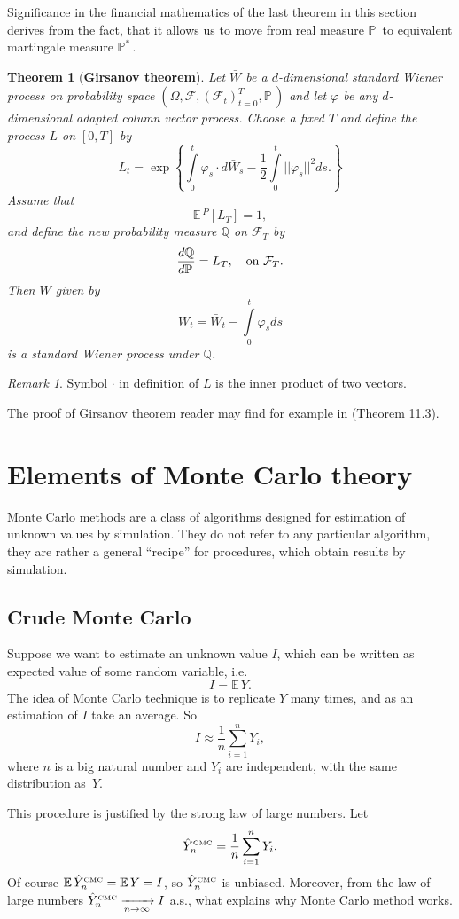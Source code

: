 \documentclass[a4paper,12pt, oneside]{book}
\newtheorem{thm}{Theorem}[section]
\theoremstyle{definition}
\theoremstyle{remark}
\newtheorem{remark}{Remark}
\def\E{{\mathbb{E}}\,}
\def\P{{\mathbb{P}}\,}
\def\Pm{{\mathbb{P}}^*\,}
\def\conv{\xrightarrow[n \rightarrow \infty]{}}
\def\CMC[#1]{\hat{Y}^{\hbox{\tiny CMC}}_{#1}}
\begin{document}
Significance in the financial mathematics of the last theorem in this section derives from the fact, that it allows us to move from real measure $\P$ to equivalent martingale measure $\Pm$.
\begin{thm}[\bfseries Girsanov theorem]
 \label{thm:girsanov}
 Let $\bar{W}$ be a $d$-dimensional standard Wiener process on probability space $(\Omega, \mathcal{F}, (\mathcal{F}_t)_{t=0}^T, \P)$ and let $\varphi$ be any $d$-dimensional adapted column vector process. Choose a fixed $T$ and define the process $L$ on $[0,T]$ by
 \[ L_t = \exp\left\{ \int\limits_0^t \varphi_s \cdot d\bar{W}_s - \frac{1}{2}\int\limits_0^t ||\varphi_s||^2ds. \right\} \]
 Assume that 
 \[ \E^P[L_T] = 1, \]
 and define the new probability measure $\mathbb{Q}$ on $\mathcal{F}_T$ by
 \[ \frac{d\mathbb{Q}}{d\P} = L_T,\ \ \hbox{ on } \mathcal{F}_T. \]
 Then $W$ given by
 \[W_t = \bar{W}_t - \int\limits_0^t \varphi_s ds\]
 is a standard Wiener process under $\mathbb{Q}$.
\end{thm}
\begin{remark}
 Symbol $\cdot$ in definition of $L$ is the inner product of two vectors. 
\end{remark}
The proof of Girsanov theorem reader may find for example in \cite{bjork} (Theorem 11.3).

\section{Elements of Monte Carlo theory}
Monte Carlo methods are a class of algorithms designed for estimation of unknown values by simulation. They do not refer to any particular algorithm, they are rather a general ``recipe'' for procedures, which obtain results by simulation.

\subsection{Crude Monte Carlo}
Suppose we want to estimate an unknown value $I$, which can be written as expected value of some random variable, i.e.
\begin{equation}
 \label{eq:EY}
 I = \E Y. 
\end{equation}
The idea of Monte Carlo technique is to replicate $Y$ many times, and as an estimation of $I$ take an average. So
\[ I \approx \frac{1}{n} \sum\limits_{i=1}^n Y_i, \]
where $n$ is a big natural number and $Y_i$ are independent, with the same distribution as~$Y$.

This procedure is justified by the strong law of large numbers. Let 
\begin{equation}
 \label{eq:CMC}
 \CMC[n] = \frac{1}{n}\sum\limits_{i=1}^n Y_i.
\end{equation}
Of course $\E\CMC[n] = \E Y = I$, so $\CMC[n]$ is unbiased. Moreover, from the law of large numbers $\CMC[n] \conv I$ a.s., what explains why Monte Carlo method works. 
\end{document}
